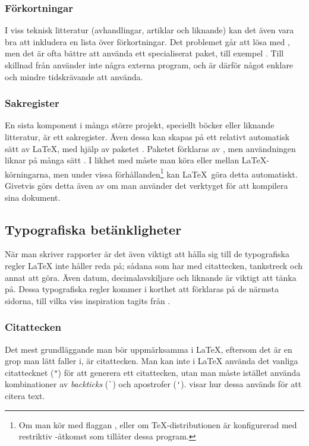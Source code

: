 \documentclass[lang=sv,ptsize=10pt,font=none,nomath,titles=bf,../../a4.tex]{subfiles}
\begin{document}
\subsubsection{Förkortningar}\label{sec:2:acro}
I viss teknisk litteratur (avhandlingar, artiklar och liknande) kan det 
även vara bra att inkludera en lista över förkortningar. Det problemet
går att lösa med , men det är ofta bättre att använda
ett specialiserat paket, till exempel 
\parencite{Niederberger13}. Till skillnad
från  använder  inte några externa program,
och är därför något enklare och mindre tidskrävande att använda.

\subsubsection{Sakregister}\label{sec:2:imakeidx}
En sista komponent i många större projekt, speciellt böcker eller
liknande litteratur, är ett sakregister. Även dessa kan skapas på ett
relativt automatisk sätt av \LaTeX, med hjälp av paketet .
Paketet förklaras av \textcite{Beccari12}, men användningen liknar
på många sätt . I likhet med  måste man
köra  eller  mellan \LaTeX-körningarna, men 
under vissa förhållanden\footnote{Om man kör  med flaggan
, eller om \TeX-distributionen är konfigurerad med
restriktiv -åtkomst som tillåter dessa program.} kan \LaTeX\ 
göra detta automatiskt. Givetvis görs detta även av  om man
använder det verktyget för att kompilera sina dokument.

\subsection{Typografiska betänkligheter}
När man skriver rapporter är det även viktigt att hålla sig till de
typografiska regler \LaTeX{} inte håller reda på; sådana som har med
citattecken, tankstreck och annat att göra. Även datum, decimalavskiljare
och liknande är viktigt att tänka på. Dessa typografiska regler kommer i
korthet att förklaras på de närmsta sidorna, till vilka viss inspiration 
tagits från \textcite{Schultz05}.

\subsubsection{Citattecken}
Det mest grundläggande man bör uppmärksamma i \LaTeX{}, eftersom det är en
grop man lätt faller i, är citattecken. Man kan inte i \LaTeX{} använda
det vanliga citattecknet (\verb|"|) för att generera ett citattecken, utan
man måste istället använda kombinationer av \emph{backticks} (\verb|`|)
och apostrofer (\verb|'|). \Cref{tab:citat} visar hur dessa används
för att citera text.
\end{document}

